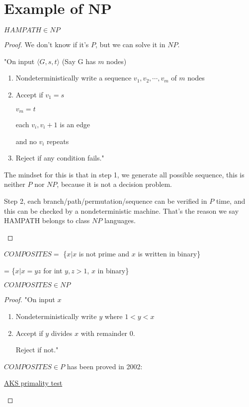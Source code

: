 \section{Example of NP}
\begin{theorem}
    \(HAMPATH \in NP\) 
\end{theorem}
\begin{proof}
    We don't know if it's \(P\), but we can solve it in \(NP\).

    "On input \(\langle G, s, t \rangle\) (Say G has \(m\) nodes)
    \begin{enumerate}
        \item Nondeterministically write a sequence \(v_1, v_2, \cdots, v_m\) of \(m\) nodes
        \item Accept if 
        \(v_1 = s\) 

        \(v_m = t\)  
        
        each \(v_i, v_i+1\) is an edge
        
        and no \(v_i\) repeats
        \item Reject if any condition fails."
    \end{enumerate}

    \begin{remark}
        The mindset for this is that in step 1, we generate all possible sequence, this is neither \(P\) nor \(NP\), because it is not a decision problem. 

        Step 2, each branch/path/permutation/sequence can be verified in \(P\) time, and this can be checked by a nondeterministic machine. 
        That's the reason we say HAMPATH belongs to class \(NP\) languages. 
    \end{remark}
\end{proof}

\begin{definition}[COMPOSITES]
    \(COMPOSITES = \) 
    \{\(x|x\) is not prime and \(x\) is written in binary\} 

    = \{\(x|x = yz\) for int \(y, z > 1\), \(x\) in binary\}
\end{definition}

\begin{theorem}
    \(COMPOSITES \in NP \) 
\end{theorem}
\begin{proof}
    "On input \(x\) 
    \begin{enumerate}
        \item Nondeterministically write \(y\) where \(1 < y < x\)
        \item Accept if \(y\) divides \(x\) with remainder \(0\).    

        Reject if not."
    \end{enumerate}

    \begin{note}[2002]
    \(COMPOSITES \in P\) has been proved in 2002:

    \href{https://en.wikipedia.org/wiki/AKS_primality_test}{AKS primality test}
    \end{note}
\end{proof}

